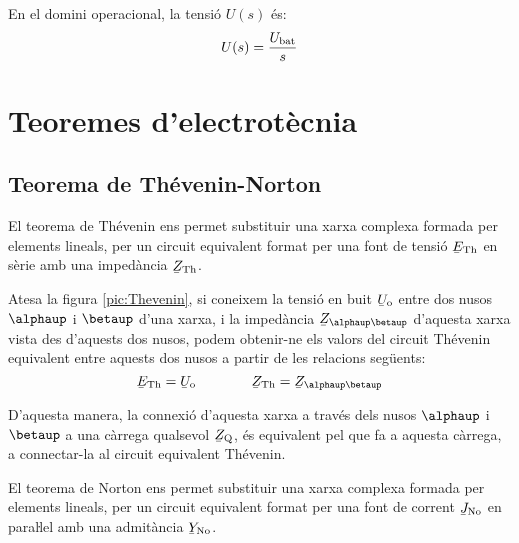  En el domini operacional, la
tensió $U(s)$ és:
\begin{equation}
	U(s) = \frac{U_\mathrm{bat}}{s}
\end{equation}



\section{Teoremes d'electrotècnia}\label{sec:teoremes}

\subsection{\texorpdfstring{Teorema de Thévenin-Norton}{Teorema de
            Thévenin-Norton}}\label{sec:T_N}

El teorema de Thévenin ens permet
substituir una xarxa complexa formada per elements lineals, per un
circuit equivalent format per una font de tensió $\cmplx{E}\ped{Th}$
en sèrie amb una impedància $\cmplx{Z}\ped{Th}$.


Atesa la figura \vref{pic:Thevenin}, si coneixem la tensió en
buit $\cmplx{U}\ped{o}$ entre dos nusos $\alphaup$ i $\betaup$ d'una
xarxa, i la impedància $\cmplx{Z}_{\alphaup\betaup}$ d'aquesta xarxa
vista des d'aquests dos nusos, podem obtenir-ne els valors del circuit
Thévenin equivalent entre aquests dos nusos a partir de les
relacions següents:
\begin{equation}
   \cmplx{E}\ped{Th} = \cmplx{U}\ped{o} \qquad\qquad  \cmplx{Z}\ped{Th} = \cmplx{Z}_{\alphaup\betaup}
\end{equation}

D'aquesta manera, la connexió d'aquesta xarxa a través dels nusos
$\alphaup$ i $\betaup$ a una càrrega qualsevol $\cmplx{Z}\ped{Q}$, és
equivalent pel que fa a aquesta càrrega, a connectar-la al circuit
equivalent Thévenin.
\begin{center}
    
    \label{pic:Thevenin}
\end{center}

El teorema de Norton ens permet substituir
una xarxa complexa formada per elements lineals, per un circuit
equivalent format per una font de corrent $\cmplx{J}\ped{No}$ en
paraŀlel amb una admitància $\cmplx{Y}\ped{No}$.


